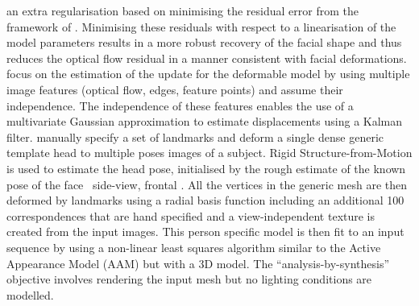 an extra regularisation based on minimising the residual error from the
framework of \citet{decarlo2000optical}. Minimising these residuals with respect
to a linearisation of the model parameters results in a more robust recovery of
the facial shape and thus reduces the optical flow residual in a manner
consistent with facial deformations.
\citet{goldenstein2004facial} focus on the estimation of the update for
the deformable model by using multiple image features (optical flow,
edges, feature points) and assume their independence. The independence
of these features enables the use of a multivariate Gaussian approximation
to estimate displacements using a Kalman filter.
\citet{pighin2002modeling} manually specify a set of landmarks and deform
a single dense generic template head to multiple poses images of a subject.
Rigid Structure-from-Motion is used to estimate the head pose, initialised
by the rough estimate of the known pose of the face \eg~side-view, frontal \etc.
All the vertices in the generic mesh are then deformed by landmarks
using a radial basis function including an additional 100 correspondences
that are hand specified and a view-independent texture is created from the input
images. This person specific model is then fit to an input
sequence by using a non-linear least squares algorithm similar to the Active
Appearance Model (AAM) but with a 3D model. The ``analysis-by-synthesis''
objective involves rendering the input mesh but no lighting conditions are
modelled.

